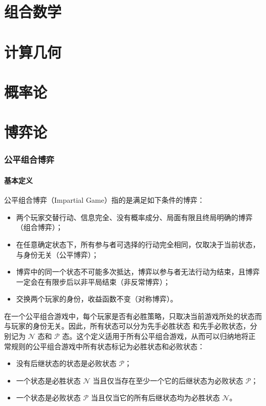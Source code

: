 \documentclass[12pt,a4paper]{article}
\begin{document}
\newpage
\part{组合数学}

\newpage
\part{计算几何}

\newpage
\part{概率论}

\newpage
\part{博弈论}
\section{公平组合博弈}
\subsection{基本定义}
公平组合博弈（Impartial Game）指的是满足如下条件的博弈：
\begin{itemize}
	\item 两个玩家交替行动、信息完全、没有概率成分、局面有限且终局明确的博弈（组合博弈）；
	\item 在任意确定状态下，所有参与者可选择的行动完全相同，仅取决于当前状态，与身份无关（公平博弈）；
	\item 博弈中的同一个状态不可能多次抵达，博弈以参与者无法行动为结束，且博弈一定会在有限步后以非平局结束（非反常博弈）；
	\item 交换两个玩家的身份，收益函数不变（对称博弈）。
\end{itemize}
在一个公平组合游戏中，每个玩家是否有必胜策略，只取决当前游戏所处的状态而与玩家的身份无关。因此，所有状态可以分为先手必胜状态 和先手必败状态，分别记为 $\mathcal N$ 态和 $\mathcal P$ 态。这个定义适用于所有公平组合游戏，从而可以归纳地将正常规则的公平组合游戏中所有状态标记为必胜状态和必败状态：
\begin{itemize}
	\item 没有后继状态的状态是必败状态 $\mathcal P$；
	\item 一个状态是必胜状态 $\mathcal N$ 当且仅当存在至少一个它的后继状态为必败状态 $\mathcal P$；
	\item 一个状态是必败状态 $\mathcal P$ 当且仅当它的所有后继状态均为必胜状态 $\mathcal N$。
\end{itemize}
\end{document}
